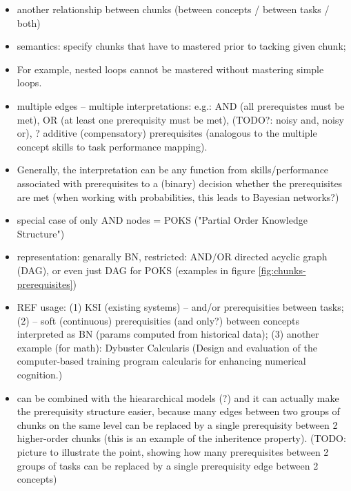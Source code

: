 \begin{itemize}
\item another relationship between chunks (between concepts / between tasks / both)
\item semantics: specify chunks that have to mastered prior to tacking given chunk;
\item For example, nested loops cannot be mastered without mastering simple loops.
\item multiple edges -- multiple interpretations: e.g.:
  AND (all prerequistes must be met),
  OR (at least one prerequisity must be met),
  (TODO?: noisy and, noisy or),
  ? additive (compensatory) prerequisites
  (analogous to the multiple concept skills to task performance mapping).
\item Generally, the interpretation can be any function from skills/performance
  associated with prerequisites to a (binary) decision whether the prerequisites are met
  (when working with probabilities, this leads to Bayesian networks?)
\item special case of only AND nodes = POKS ("Partial Order Knowledge Structure")
\item representation: genarally BN, restricted: AND/OR directed acyclic graph (DAG),
  or even just DAG for POKS (examples in figure \ref{fig:chunks-prerequisites})
\item REF usage:
  (1) KSI (existing systems) -- and/or prerequisities between tasks;
  (2) \cite{its-programming} -- soft (continuous) prerequisities (and only?)
    between concepts interpreted as BN (params computed from historical data);
  (3) another example (for math): Dybuster Calcularis (Design and evaluation of the computer-based training program calcularis for enhancing numerical cognition.)
\item can be combined with the hieararchical models
  (?) and it can actually make the prerequisity structure easier, because
    many edges between two groups of chunks on the same level
    can be replaced by a single prerequisity between 2 higher-order chunks
    (this is an example of the inheritence property).
  (TODO: picture to illustrate the point, showing how many prerequisites between
    2 groups of tasks can be replaced by a single prerequisity edge between 2 concepts)
\end{itemize}






